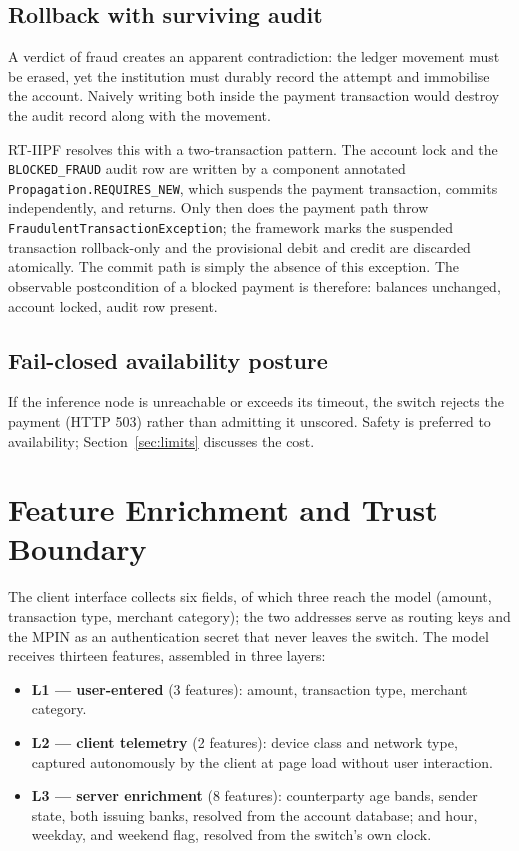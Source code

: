 \documentclass[conference]{IEEEtran}
\begin{document}
\subsection{Rollback with surviving audit}

A verdict of fraud creates an apparent contradiction: the ledger movement
must be erased, yet the institution must durably record the attempt and
immobilise the account. Naively writing both inside the payment transaction
would destroy the audit record along with the movement.

RT-IIPF resolves this with a two-transaction pattern. The account lock and
the \texttt{BLOCKED\_FRAUD} audit row are written by a component annotated
\texttt{Propagation.REQUIRES\_NEW}, which suspends the payment transaction,
commits independently, and returns. Only then does the payment path throw
\texttt{FraudulentTransactionException}; the framework marks the suspended
transaction rollback-only and the provisional debit and credit are discarded
atomically. The commit path is simply the absence of this exception. The
observable postcondition of a blocked payment is therefore: balances
unchanged, account locked, audit row present.

\subsection{Fail-closed availability posture}

If the inference node is unreachable or exceeds its timeout, the switch
rejects the payment (HTTP 503) rather than admitting it unscored. Safety is
preferred to availability; Section~\ref{sec:limits} discusses the cost.

\section{Feature Enrichment and Trust Boundary}
\label{sec:enrich}

The client interface collects six fields, of which three reach the model
(amount, transaction type, merchant category); the two addresses serve as
routing keys and the MPIN as an authentication secret that never leaves the
switch. The model receives thirteen features, assembled in three layers:

\begin{itemize}
\item \textbf{L1 --- user-entered} (3 features): amount, transaction type,
merchant category.
\item \textbf{L2 --- client telemetry} (2 features): device class and network
type, captured autonomously by the client at page load without user
interaction.
\item \textbf{L3 --- server enrichment} (8 features): counterparty age
bands, sender state, both issuing banks, resolved from the account database;
and hour, weekday, and weekend flag, resolved from the switch's own clock.
\end{itemize}
\end{document}
